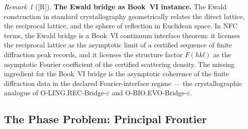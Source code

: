 \documentclass[12pt,oneside]{amsbook}
\theoremstyle{plain}
\theoremstyle{definition}
\theoremstyle{remark}
\newtheorem{remark}[theorem]{Remark}
\newcommand{\status}[1]{\textup{[#1]}}
\begin{document}
\begin{remark}[\status{R}]\label{rem:cryst-ewald-note}
\textbf{The Ewald bridge as Book~VI instance.}
The Ewald construction in standard crystallography geometrically
relates the direct lattice, the reciprocal lattice, and the
sphere of reflection in Euclidean space.  In NFC terms, the
Ewald bridge is a Book~VI continuum interface theorem: it
licenses the reciprocal lattice as the asymptotic limit of a
certified sequence of finite diffraction peak records, and it
licenses the structure factor $F(hkl)$ as the asymptotic Fourier
coefficient of the certified scattering density.  The missing
ingredient for the Book~VI bridge is the asymptotic coherence
of the finite diffraction data in the declared Fourier-interface
regime --- the crystallographic analogue of
O-LING.REC-Bridge-$\varepsilon$ and O-BIO.EVO-Bridge-$\varepsilon$.
\end{remark}

\subsection{The Phase Problem: Principal Frontier}\label{sec:cryst-phase}
\end{document}
